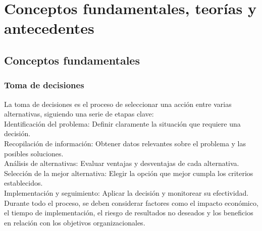 \fancyhead{}
\fancyfoot{}
\newtheorem{teorema}{Teorema}
\cfoot{\thepage}
\setlength{\headheight}{15pt}  %




\chapter{Conceptos fundamentales, teorías y antecedentes}


\section{Conceptos fundamentales}
\subsection{Toma de decisiones}
La toma de decisiones es el proceso de seleccionar una acción entre varias alternativas, siguiendo una serie de etapas clave: \\
Identificación del problema: Definir claramente la situación que requiere una decisión.\\
Recopilación de información: Obtener datos relevantes sobre el problema y las posibles soluciones.\\
Análisis de alternativas: Evaluar ventajas y desventajas de cada alternativa.\\
Selección de la mejor alternativa: Elegir la opción que mejor cumpla los criterios establecidos.\\
Implementación y seguimiento: Aplicar la decisión y monitorear su efectividad.\\
Durante todo el proceso, se deben considerar factores como el impacto económico, el tiempo de implementación, el riesgo de resultados no deseados y los beneficios en relación con los objetivos organizacionales.\\
